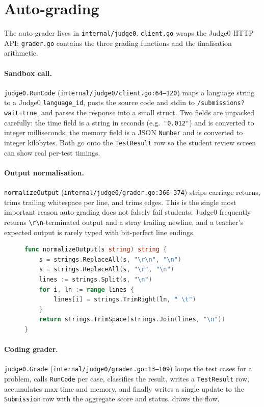 \section{Auto-grading}

The auto-grader lives in \texttt{internal/judge0}. \texttt{client.go} wraps the Judge0 HTTP API; \texttt{grader.go} contains the three grading functions and the finalisation arithmetic.

\paragraph{Sandbox call.} \texttt{judge0.RunCode} (\texttt{internal/judge0/client.go:64--120}) maps a language string to a Judge0 \texttt{language\_id}, posts the source code and stdin to \texttt{/submissions?wait=true}, and parses the response into a small struct. Two fields are unpacked carefully: the time field is a string in seconds (e.g.\ \texttt{"0.012"}) and is converted to integer milliseconds; the memory field is a JSON \texttt{Number} and is converted to integer kilobytes. Both go onto the \texttt{TestResult} row so the student review screen can show real per-test timings.

\paragraph{Output normalisation.} \texttt{normalizeOutput} (\texttt{internal/judge0/grader.go:366--374}) strips carriage returns, trims trailing whitespace per line, and trims edges. This is the single most important reason auto-grading does not falsely fail students: Judge0 frequently returns \texttt{\textbackslash r\textbackslash n}-terminated output and a stray trailing newline, and a teacher's expected output is rarely typed with bit-perfect line endings.

\begin{figure}[H]
\begin{lstlisting}[language=Go,caption={Output normalisation (\texttt{internal/judge0/grader.go:366--374}).},label={lst:normalize}]
func normalizeOutput(s string) string {
    s = strings.ReplaceAll(s, "\r\n", "\n")
    s = strings.ReplaceAll(s, "\r", "\n")
    lines := strings.Split(s, "\n")
    for i, ln := range lines {
        lines[i] = strings.TrimRight(ln, " \t")
    }
    return strings.TrimSpace(strings.Join(lines, "\n"))
}
\end{lstlisting}
\end{figure}

\paragraph{Coding grader.} \texttt{judge0.Grade} (\texttt{internal/judge0/grader.go:13--109}) loops the test cases for a problem, calls \texttt{RunCode} per case, classifies the result, writes a \texttt{TestResult} row, accumulates max time and memory, and finally writes a single update to the \texttt{Submission} row with the aggregate score and status.  draws the flow.

